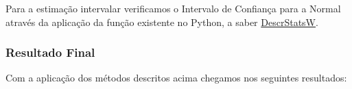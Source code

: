 \documentclass[12pt, a4paper]{article}
\begin{document}
    Para a estimação intervalar verificamos o Intervalo de Confiança para a Normal através da aplicação da função existente no Python, a saber \href{https://www.statsmodels.org/dev/generated/statsmodels.stats.weightstats.DescrStatsW.html}{DescrStatsW}.
    \break
    
    \subsubsection{Resultado Final}
    Com a aplicação dos métodos descritos acima chegamos nos seguintes resultados:
    \break\\      
    
    \begin{table}[]
    \caption{Resultados}
    \label{tab:exe3}
    \end{table}
    \break    
    
    
	
	
	
\end{document}
